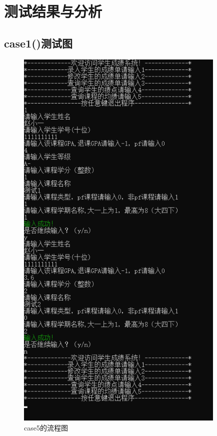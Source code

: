 \documentclass[fontset=windows]{article}
\begin{document}
\section{测试结果与分析}
\subsection{case1()测试图}

\begin{figure}[h]
	\begin{center}
		\vspace{0.5cm}
		\includegraphics[width = 10cm]{case1_exp.png}
		\vspace{0.5cm}
		\caption{case5的流程图}
	\end{center}
\end{figure}
\end{document}
